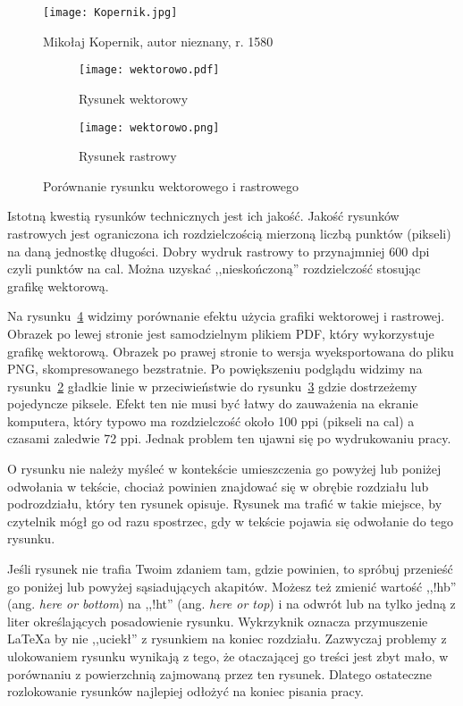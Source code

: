 \begin{figure}[!hb]
	\centering \texttt{[image: Kopernik.jpg]}
	\caption{Mikołaj Kopernik, autor nieznany, r. 1580}
	\label{rys:kopernik}
\end{figure}

\begin{figure}
\centering
\begin{subfigure}{.5\textwidth}
  \centering
  \texttt{[image: wektorowo.pdf]}
  \caption{Rysunek wektorowy}
  \label{rys:wektorowopdf}
\end{subfigure}%
\begin{subfigure}{.5\textwidth}
  \centering
  \texttt{[image: wektorowo.png]}
  \caption{Rysunek rastrowy}
  \label{rys:wektorowopng}
\end{subfigure}
\caption{Porównanie rysunku wektorowego i rastrowego}
\label{rys:wektorowo}
\end{figure}

Istotną kwestią rysunków technicznych jest ich jakość. Jakość rysunków rastrowych jest ograniczona ich rozdzielczością mierzoną liczbą punktów (pikseli) na daną jednostkę długości. Dobry wydruk rastrowy to przynajmniej 600 dpi czyli punktów na cal. Można uzyskać ,,nieskończoną'' rozdzielczość stosując grafikę wektorową.

Na rysunku~\ref{rys:wektorowo} widzimy porównanie efektu użycia grafiki wektorowej i rastrowej. Obrazek po lewej stronie jest samodzielnym plikiem PDF, który wykorzystuje grafikę wektorową. Obrazek po prawej stronie to wersja wyeksportowana do pliku PNG, skompresowanego bezstratnie. Po powiększeniu podglądu widzimy na rysunku~\ref{rys:wektorowopdf} gładkie linie w przeciwieństwie do rysunku~\ref{rys:wektorowopng} gdzie dostrzeżemy pojedyncze piksele. Efekt ten nie musi być łatwy do zauważenia na ekranie komputera, który typowo ma rozdzielczość około 100 ppi (pikseli na cal) a czasami zaledwie 72 ppi. Jednak problem ten ujawni się po wydrukowaniu pracy.

O rysunku nie należy myśleć w kontekście umieszczenia go powyżej lub poniżej odwołania w tekście, chociaż powinien znajdować się w obrębie rozdziału lub podrozdziału, który ten rysunek opisuje. Rysunek ma trafić w takie miejsce, by czytelnik mógł go od razu spostrzec, gdy w tekście pojawia się odwołanie do tego rysunku.

Jeśli rysunek nie trafia Twoim zdaniem tam, gdzie powinien, to spróbuj przenieść go poniżej lub powyżej sąsiadujących akapitów. Możesz też zmienić wartość ,,!hb'' (ang. \textit{here or bottom}) na ,,!ht'' (ang. \textit{here or top}) i na odwrót lub na tylko jedną z liter określających posadowienie rysunku. Wykrzyknik oznacza przymuszenie \LaTeX{a} by nie ,,uciekł'' z rysunkiem na koniec rozdziału. Zazwyczaj problemy z ulokowaniem rysunku wynikają z tego, że otaczającej go treści jest zbyt mało, w porównaniu z powierzchnią zajmowaną przez ten rysunek. Dlatego ostateczne rozlokowanie rysunków najlepiej odłożyć na koniec pisania pracy.

